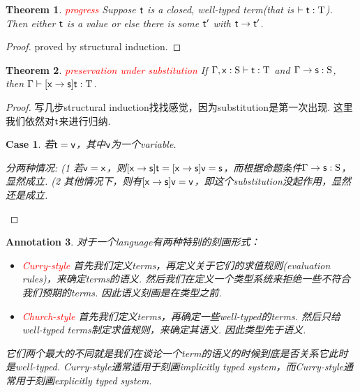 \documentclass{article}
\theoremstyle{plain}
\newtheorem{theorem}{Theorem}
\newtheorem{annotation}[theorem]{Annotation}
\newtheorem{case}{Case}
\theoremstyle{nonumberplain}
\newtheorem{proof}{Proof}
\newcommand{\singletype}[1]{\text{#1}}
\newcommand{\termtype}[2]{\ensuremath{#1:#2}}
\newcommand{\term}[1]{\ensuremath\mathsf{#1}}
\newcommand{\redt}[1]{\textcolor{red}{#1}}
\begin{document}
\begin{theorem}
\rm \redt{progress} Suppose $\term{t}$ is a closed, well-typed term(that is $\vdash \termtype{\term{t}}{\singletype{T}}$). Then either $\term{t}$ is a value or else there is some $\term{t}'$ with $\term{t} \to \term{t}'$. 
\end{theorem}

\begin{proof}
proved by structural induction.
\end{proof}

\begin{theorem}
\rm \redt{preservation under substitution} If $\Gamma,  \termtype{\term{x}}{\singletype{S}} \vdash \termtype{\term{t}}{\singletype{T}}$ and $\Gamma \to \termtype{\term{s}}{\singletype{S}}$, then $\Gamma \vdash \termtype{[\term{x} \to \term{s}]\term{t}}{\singletype{T}}$.
\end{theorem}

\begin{proof}
\rm 写几步structural induction找找感觉，因为substitution是第一次出现. 这里我们依然对$\term{t}$来进行归纳.  

\begin{case}
若$\term{t} = \term{v}$，其中$\term{v}$为一个variable. 

分两种情况: (1 若$\term{v} = \term{x}$，则$[\term{x} \to \term{s}]\term{t} = [\term{x} \to \term{s}]\term{v} = \term{s}$，而根据命题条件$\Gamma \to \termtype{\term{s}}{\singletype{S}}$，显然成立. (2 其他情况下，则有$[\term{x} \to \term{s}]\term{v} = \term{v}$，即这个substitution没起作用，显然还是成立. 
\end{case}
\end{proof}

\begin{annotation}
\rm 对于一个language有两种特别的刻画形式：
\begin{itemize}
	\item \redt{Curry-style} 首先我们定义terms，再定义关于它们的求值规则(evaluation rules)，来确定terms的语义. 然后我们在定义一个类型系统来拒绝一些不符合我们预期的terms. 因此语义刻画是在类型之前.
	\item \redt{Church-style} 首先我们定义terms，再确定一些well-typed的terms. 然后只给well-typed terms制定求值规则，来确定其语义. 因此类型先于语义. 
\end{itemize}
它们两个最大的不同就是我们在谈论一个term的语义的时候到底是否关系它此时是well-typed. Curry-style通常适用于刻画implicitly typed system，而Curry-style通常用于刻画explicitly typed system. 
\end{annotation}
\end{document}
